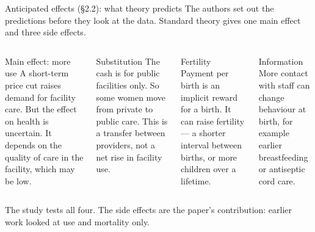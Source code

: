 \documentclass[aspectratio=169,11pt]{beamer}
\begin{document}
\begin{frame}{Anticipated effects (\S2.2): what theory predicts}
  The authors set out the predictions before they look at the data. Standard theory gives one main effect and three side effects.
  \vspace{0.3em}
  \begin{columns}[T]
    \begin{block}{Main effect: more use}
      {\footnotesize A short-term price cut raises demand for facility care. But the effect on health is uncertain. It depends on the quality of care in the facility, which may be low.}
    \end{block}
    \begin{block}{Substitution}
      {\footnotesize The cash is for public facilities only. So some women move from private to public care. This is a transfer between providers, not a net rise in facility use.}
    \end{block}
    \begin{block}{Fertility}
      {\footnotesize Payment per birth is an implicit reward for a birth. It can raise fertility --- a shorter interval between births, or more children over a lifetime.}
    \end{block}
    \begin{block}{Information}
      {\footnotesize More contact with staff can change behaviour at birth, for example earlier breastfeeding or antiseptic cord care.}
    \end{block}
  \end{columns}
  \vspace{0.2em}
  \footnotesize The study tests all four. The side effects are the paper's contribution: earlier work looked at use and mortality only.
\end{frame}
\end{document}
